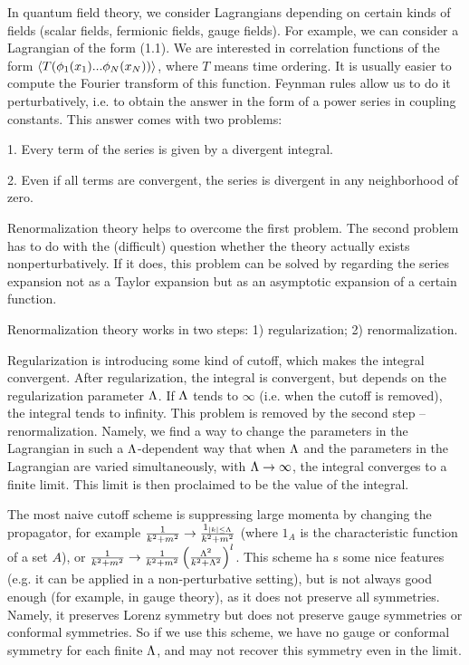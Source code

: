In quantum field theory, we consider Lagrangians depending on certain
kinds of fields (scalar fields, fermionic fields, gauge fields).
For example, we can consider a Lagrangian of the form (1.1). 
We are interested in correlation functions of the form
$\langle T(\phi_1(x_1)...\phi_N(x_N))\rangle$, where $T$ means time ordering.
It is usually easier to compute the Fourier transform of this function. 
Feynman rules allow us to do it perturbatively, i.e. to obtain the answer
in the form of a power series in coupling constants.  
This answer comes with two problems:

1. Every term of the series is given by a divergent integral.

2. Even if all terms are convergent, the series is divergent in 
any neighborhood of zero. 

Renormalization theory helps to overcome the first problem.
The second problem has to do with the (difficult) question 
whether the theory actually exists nonperturbatively. 
If it does, this problem can be solved by regarding the series 
expansion not as a Taylor expansion but as an asymptotic
expansion of a certain function. 

Renormalization theory works in two steps:
1) regularization; 2) renormalization. 

Regularization is introducing some kind of cutoff, which makes 
the integral convergent. After regularization, the integral 
is convergent, but depends on the regularization parameter $\Lambda$. 
If $\Lambda$ tends to $\infty$ (i.e. when the cutoff is removed), 
the integral tends to infinity. This problem is removed by the second step
-- renormalization. Namely, we find a way to change the parameters in the 
Lagrangian in such a $\Lambda$-dependent way that when $\Lambda$ and the parameters 
in the Lagrangian are varied simultaneously, with $\Lambda\to\infty$, 
the integral converges to a finite limit. 
This limit is then proclaimed to be the value of the integral.

The most naive cutoff scheme is suppressing large momenta
by changing the propagator, for example
$\frac{1}{k^2+m^2}\to \frac{1_{|k|\le \Lambda}}{k^2+m^2}$ (where
$1_A$ is the characteristic function of a set $A$), or
$\frac{1}{k^2+m^2}\to \frac{1}{k^2+m^2}\left(\frac{\Lambda^2}{k^2+\Lambda^2}\right)^l$.
This scheme ha s some nice features (e.g. it can be applied in a
non-perturbative setting), but
is not always good enough (for example, in gauge theory), 
as it does not preserve 
all symmetries. Namely, it preserves Lorenz symmetry but does not preserve 
gauge symmetries or conformal symmetries. So if we use 
this scheme, we have no gauge or conformal symmetry for each finite $\Lambda$,
and may not recover this symmetry even in the limit. 

